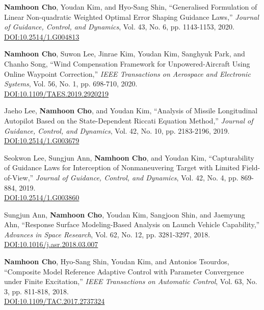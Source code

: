 \begin{enumerate}[itemsep=0.5em, label={[}J\arabic*{]}]
\item \textbf{Namhoon Cho}, Youdan Kim, and Hyo-Sang Shin, ``Generalised Formulation of Linear Non-quadratic Weighted Optimal Error Shaping Guidance Laws,'' \textit{Journal of Guidance, Control, and Dynamics}, Vol. 43, No. 6, pp. 1143-1153, 2020. \\
 \href{https://doi.org/10.2514/1.G004813}{DOI:10.2514/1.G004813}

\item \textbf{Namhoon Cho}, Suwon Lee, Jinrae Kim, Youdan Kim, Sanghyuk Park, and Chanho Song, ``Wind Compensation Framework for Unpowered-Aircraft Using Online Waypoint Correction,'' \textit{IEEE Transactions on Aerospace and Electronic Systems}, Vol. 56, No. 1, pp. 698-710, 2020. \\
 \href{https://doi.org/10.1109/TAES.2019.2920219}{DOI:10.1109/TAES.2019.2920219}

\item Jaeho Lee, \textbf{Namhoon Cho}, and Youdan Kim, ``Analysis of Missile Longitudinal Autopilot Based on the State-Dependent Riccati Equation Method,'' \textit{Journal of Guidance, Control, and Dynamics}, Vol. 42, No. 10, pp. 2183-2196, 2019. \\
 \href{https://doi.org/10.2514/1.G003679}{DOI:10.2514/1.G003679}

\item Seokwon Lee, Sungjun Ann, \textbf{Namhoon Cho}, and Youdan Kim, ``Capturability of Guidance Laws for Interception of Nonmaneuvering Target with Limited Field-of-View,'' \textit{Journal of Guidance, Control, and Dynamics}, Vol. 42, No. 4, pp. 869-884, 2019. \\
 \href{https://doi.org/10.2514/1.G003860}{DOI:10.2514/1.G003860}

\item Sungjun Ann, \textbf{Namhoon Cho}, Youdan Kim, Sangjoon Shin, and Jaemyung Ahn, ``Response Surface Modeling-Based Analysis on Launch Vehicle Capability,'' \textit{Advances in Space Research}, Vol. 62, No. 12, pp. 3281-3297, 2018. \\
 \href{https://doi.org/10.1016/j.asr.2018.03.007}{DOI:10.1016/j.asr.2018.03.007}

\item \textbf{Namhoon Cho}, Hyo-Sang Shin, Youdan Kim, and Antonios Tsourdos, ``Composite Model Reference Adaptive Control with Parameter Convergence under Finite Excitation,'' \textit{IEEE Transactions on Automatic Control}, Vol. 63, No. 3, pp. 811-818, 2018. \\
 \href{https://doi.org/10.1109/TAC.2017.2737324}{DOI:10.1109/TAC.2017.2737324}


\end{enumerate}
